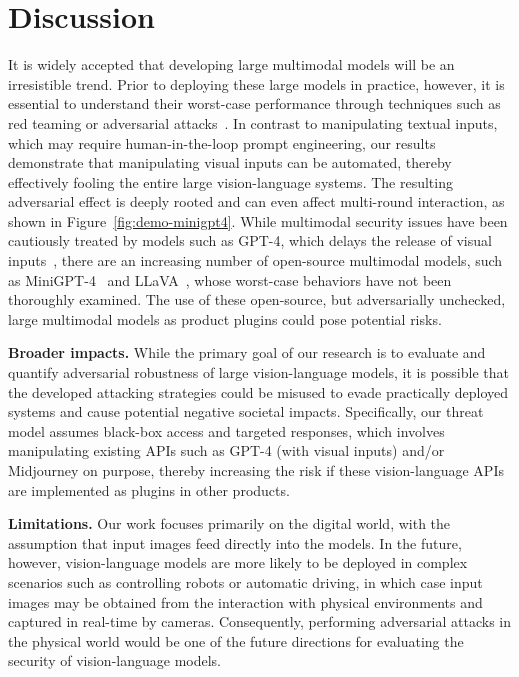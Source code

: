 \vspace{-0.1cm}
\section{Discussion}
\vspace{-0.05cm}
\label{sec:discussion}

It is widely accepted that developing large multimodal models will be an irresistible trend. Prior to deploying these large models in practice, however, it is essential to understand their worst-case performance through techniques such as red teaming or adversarial attacks~\citep{dong2023robust}. In contrast to manipulating textual inputs, which may require human-in-the-loop prompt engineering, our results demonstrate that manipulating visual inputs can be automated, thereby effectively fooling the entire large vision-language systems. The resulting adversarial effect is deeply rooted and can even affect multi-round interaction, as shown in Figure~\ref{fig:demo-minigpt4}. While multimodal security issues have been cautiously treated by models such as GPT-4, which delays the release of visual inputs~\citep{delaygpt4}, there are an increasing number of open-source multimodal models, such as MiniGPT-4~\citep{zhu2023minigpt} and LLaVA~\citep{liu2023llava,liu2023improved}, whose worst-case behaviors have not been thoroughly examined. The use of these open-source, but adversarially unchecked, large multimodal models as product plugins could pose potential risks.

\textbf{Broader impacts.} While the primary goal of our research is to evaluate and quantify adversarial robustness of large vision-language models, it is possible that the developed attacking strategies could be misused to evade practically deployed systems and cause potential negative societal impacts. Specifically, our threat model assumes black-box access and targeted responses, which involves manipulating existing APIs such as GPT-4 (with visual inputs) and/or Midjourney on purpose, thereby increasing the risk if these vision-language APIs are implemented as plugins in other products.

\textbf{Limitations.} Our work focuses primarily on the digital world, with the assumption that input images feed directly into the models. In the future, however, vision-language models are more likely to be deployed in complex scenarios such as controlling robots or automatic driving, in which case input images may be obtained from the interaction with physical environments and captured in real-time by cameras. Consequently, performing adversarial attacks in the physical world would be one of the future directions for evaluating the security of vision-language models.

